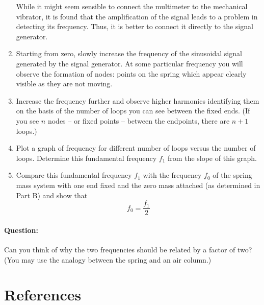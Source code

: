 \begin{refsection}
\begin{enumerate}
\begin{tip}
While it might seem sensible to connect the multimeter to the mechanical vibrator, it is found that the amplification of the signal leads to a problem in detecting its frequency. Thus, it is better to connect it directly to the signal generator.
\end{tip}

\item Starting from zero, slowly increase the frequency of the sinusoidal signal generated by the signal generator. At some particular frequency you will observe the formation of nodes: points on the spring which appear clearly visible as they are not moving.

\item Increase the frequency further and observe higher harmonics identifying them on the basis of the number of loops you can see between the fixed ends. (If you see $n$ nodes -- or fixed points -- between the endpoints, there are $n+1$ loops.)

\item Plot a graph of frequency for different number of loops versus the number of loops. Determine this fundamental frequency $f_1$ from the slope of this graph.

\item Compare this fundamental frequency $f_1$ with the frequency $f_0$ of the spring mass
system with one end fixed and the zero mass attached (as determined in Part B) and
show that $$f_0 = \frac{f_1}{2}$$
\end{enumerate}

\begin{question}
\paragraph{Question:} Can you think of why the two frequencies should be related by a factor of two? (You may use the analogy between the spring and an air column.)
\end{question}


\section*{References}




\end{refsection}
